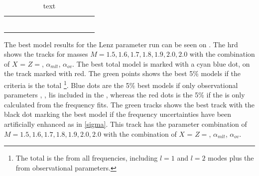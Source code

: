 \begin{table}[]
\begin{tabular}{lllllllllllll}
		&                  &   &   &                &               &                      &                      &                   &              &                     &                &                 \\
		&                  &   &   &                &               &                      &                      &                   &              &                     &                &                 \\
		&                  &   &   &                &               &                      &                      &                   &              &                     &                &                 \\
		&                  &   &   &                &               &                      &                      &                   &              &                     &                &                 \\
		&                  &   &   &                &               &                      &                      &                   &              &                     &                &                 \\
		&                  &   &   &                &               &                      &                      &                   &              &                     &                &                
	\end{tabular}
	\caption{text}
	\label{bestmodels}
\end{table}
The best model results for the Lenz parameter run can be seen on . The hrd shows the tracks for masses $M = 1.5,1.6,1.7,1.8,1.9,2.0,2.0$ with the combination of $X$ = $Z=$, $\alpha_{mlt}$, $\alpha_{ov}$. The best total model is marked with a cyan blue dot, on the track marked with red. The green points shows the best 5\% models if the criteria is the total \chis\footnote{The total \chis is the \chis from all frequencies, including $l=1$ and $l=2$ modes plus the \chis from observational parameters.}. Blue dots are the 5\% best models if only observational parameters \logg, \teff, \l is included in the \chis, whereas the red dots is the 5\% if the \chis is only calculated from the frequency fits. The green tracks shows the best track with the black dot marking the best model if the frequency uncertainties have been artificially enhanced as in \eqref{sigma}. This track has the parameter combination of $M = 1.5,1.6,1.7,1.8,1.9,2.0,2.0$ with the combination of $X$ = $Z=$, $\alpha_{mlt}$, $\alpha_{ov}$. 

